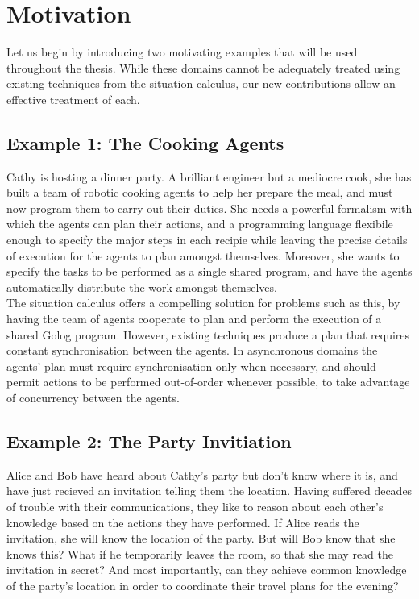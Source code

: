 \section{Motivation}

Let us begin by introducing two motivating examples that will be used
throughout the thesis. While these domains cannot be adequately treated
using existing techniques from the situation calculus, our new contributions
allow an effective treatment of each.


\subsection*{Example 1: The Cooking Agents}

Cathy is hosting a dinner party. A brilliant engineer but a mediocre
cook, she has built a team of robotic cooking agents to help her prepare
the meal, and must now program them to carry out their duties. She
needs a powerful formalism with which the agents can plan their actions,
and a programming language flexibile enough to specify the major steps
in each recipie while leaving the precise details of execution for
the agents to plan amongst themselves. Moreover, she wants to specify
the tasks to be performed as a single shared program, and have the
agents automatically distribute the work amongst themselves.\\


The situation calculus offers a compelling solution for problems such
as this, by having the team of agents cooperate to plan and perform
the execution of a shared Golog program. However, existing techniques
produce a plan that requires constant synchronisation between the
agents. In asynchronous domains the agents' plan must require synchronisation
only when necessary, and should permit actions to be performed out-of-order
whenever possible, to take advantage of concurrency between the agents.


\subsection*{Example 2: The Party Invitiation}

Alice and Bob have heard about Cathy's party but don't know where
it is, and have just recieved an invitation telling them the location.
Having suffered decades of trouble with their communications, they
like to reason about each other's knowledge based on the actions they
have performed. If Alice reads the invitation, she will know the location
of the party. But will Bob know that she knows this? What if he temporarily
leaves the room, so that she may read the invitation in secret? And
most importantly, can they achieve common knowledge of the party's
location in order to coordinate their travel plans for the evening?\\


